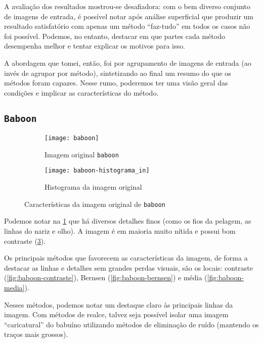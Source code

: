 \documentclass[brazilian,a4paper,twocolumn]{article}
\begin{document}
    A avaliação dos resultados mostrou-se desafiadora: com o bem diverso conjunto de imagens de entrada, é possível notar após análise superficial que produzir um resultado satisfatório com apenas um método ``faz-tudo'' em todos os casos não foi possível. Podemos, no entanto, destacar em que partes cada método desempenha melhor e tentar explicar os motivos para isso.

    A abordagem que tomei, então, foi por agrupamento de imagens de entrada (ao invés de agrupar por método), sintetizando ao final um resumo do que os métodos foram capazes. Nesse rumo, poderemos ter uma visão geral das condições e implicar as características do método.

    \subsection{\texttt{Baboon}}
    \label{sec:baboon}

        \begin{figure}[h]
            \centering
            \begin{subfigure}{0.30\textwidth}
                \texttt{[image: baboon]}
                \caption{Imagem original \texttt{baboon}}
                \label{fig:baboon}
            \end{subfigure}
            \begin{subfigure}{0.5\textwidth}
                \texttt{[image: baboon-histograma\_in]}
                \caption{Histograma da imagem original}
                \label{fig:baboon-histograma}
            \end{subfigure}

            \caption{Características da imagem original de \texttt{baboon}}
        \end{figure}

        Podemos notar na \cref{fig:baboon} que há diversos detalhes finos (como os fios da pelagem, as linhas do nariz e olho). A imagem é em maioria muito nítida e possui bom contraste (\cref{fig:baboon-histograma}).

        Os principais métodos que favorecem as características da imagem, de forma a destacar as linhas e detalhes sem grandes perdas visuais, são os locais: contraste (\cref{fig:baboon-contraste}), Bernsen (\cref{fig:baboon-bernsen}) e média (\cref{fig:baboon-media}).

        Nesses métodos, podemos notar um destaque claro às principais linhas da imagem. Com métodos de realce, talvez seja possível isolar uma imagem ``caricatural'' do babuíno utilizando métodos de eliminação de ruído (mantendo os traços mais grossos).
\end{document}
